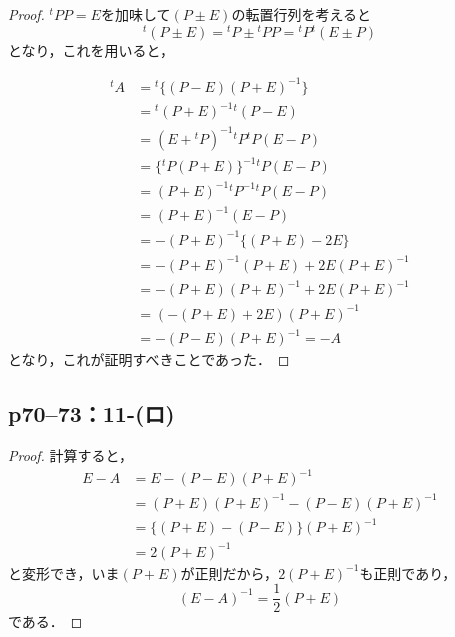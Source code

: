\documentclass[a4paper,10pt,fleqn]{ltjsarticle}
\begin{document}
\begin{tleftbar}
    \begin{proof}
        ${}^t PP =E$を加味して$(P \pm E)$の転置行列を考えると
        \[
            {}^t (P \pm E) = {}^t P \pm {}^t PP = {}^t P {}^t (E \pm P)
        \]
        となり，これを用いると，

        \begin{align*}
            {}^t A & ={}^t  \{ (P-E)(P+E)^{-1} \}            \\
                   & = {}^t (P+E)^{-1} {}^t (P-E)            \\
                   & = (E+{}^t P)^{-1} {}^t P {}^t P (E-P)   \\
                   & = \{ {}^t P (P+E)  \}^{-1} {}^t P (E-P) \\
                   & = (P+E)^{-1} {}^t P^{-1} {}^t P (E-P)   \\
                   & = (P+E)^{-1} (E-P)                      \\
                   & = -(P+E)^{-1} \{ (P+E)-2E \}            \\
                   & = -(P+E)^{-1} (P+E) +2E (P+E)^{-1}      \\
                   & = -(P+E) (P+E)^{-1} +2E (P+E)^{-1}      \\
                   & = (-(P+E)+2E) (P+E)^{-1}                \\
                   & = -(P-E) (P+E)^{-1} = -A
        \end{align*}
        となり，これが証明すべきことであった．
    \end{proof}
\end{tleftbar}


\subsection*{p70--73：11-(ロ)}

\begin{tleftbar}
    \begin{proof}

        計算すると，
        \begin{align*}
            E-A & = E-(P-E) (P+E)^{-1}                 \\
                & = (P+E)(P+E)^{-1} - (P-E) (P+E)^{-1} \\
                & = \{ (P+E)-(P-E) \} (P+E)^{-1}       \\
                & = 2(P+E)^{-1}
        \end{align*}
        と変形でき，いま$(P+E)$が正則だから，$2(P+E)^{-1}$も正則であり，
        \[
            (E-A)^{-1} = \frac{1}{2} (P+E)
        \]
        である．
    \end{proof}
\end{tleftbar}
\end{document}
